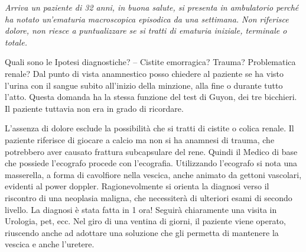   \textit{Arriva un paziente di 32 anni, in buona salute, si presenta in
  ambulatorio perché ha notato un'ematuria macroscopica episodica da una
  settimana. Non riferisce dolore, non riesce a puntualizzare se si
  tratti di ematuria iniziale, terminale o totale.}

Quali sono le Ipotesi diagnostiche? -- Cistite emorragica? Trauma?
Problematica renale? Dal punto di vista anamnestico posso chiedere al
paziente se ha visto l'urina con il sangue subito all'inizio della
minzione, alla fine o durante tutto l'atto. Questa domanda ha la stessa
funzione del test di Guyon, dei tre bicchieri. Il paziente tuttavia non
era in grado di ricordare.

L'assenza di dolore esclude la possibilità che si tratti di cistite o
colica renale. Il paziente riferisce di giocare a calcio ma non si ha
anamnesi di trauma, che potrebbero aver causato frattura subcapsulare
del rene. Quindi il Medico di base che possiede l'ecografo procede con
l'ecografia. Utilizzando l'ecografo si nota una masserella, a forma di
cavolfiore nella vescica, anche animato da gettoni vascolari, evidenti
al power doppler. Ragionevolmente si orienta la diagnosi verso il
riscontro di una neoplasia maligna, che necessiterà di ulteriori esami
di secondo livello. La diagnosi è stata fatta in 1 ora! Seguirà
chiaramente una visita in Urologia, pet, ecc. Nel giro di una ventina di
giorni, il paziente viene operato, riuscendo anche ad adottare una
soluzione che gli permetta di mantenere la vescica e anche l'uretere.